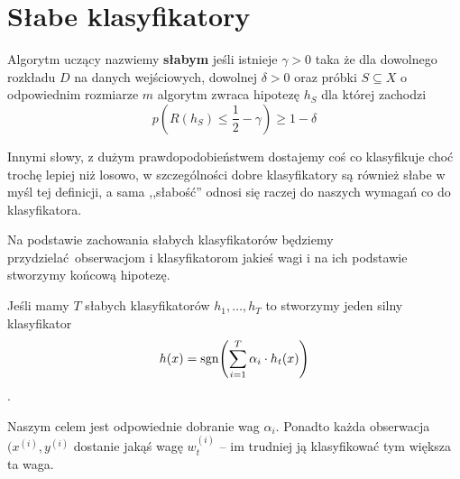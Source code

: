 \section{Słabe klasyfikatory}

\begin{definition}
Algorytm uczący nazwiemy \textbf{słabym} jeśli istnieje \( \gamma > 0 \) taka że dla dowolnego rozkładu \( D \) na danych wejściowych, dowolnej \( \delta > 0 \) oraz próbki \( S \subseteq X \) o odpowiednim rozmiarze \( m \) algorytm zwraca hipotezę \( h_S \) dla której zachodzi
\[
    p(R(h_S) \leq \frac{1}{2} - \gamma) \geq 1 - \delta
\]
\end{definition}

Innymi słowy, z dużym prawdopodobieństwem dostajemy coś co klasyfikuje choć trochę lepiej niż losowo, w szczególności dobre klasyfikatory są również słabe w myśl tej definicji, a sama ,,słabość'' odnosi się raczej do naszych wymagań co do klasyfikatora.

Na podstawie zachowania słabych klasyfikatorów będziemy przydzielać obserwacjom i klasyfikatorom jakieś wagi i na ich podstawie stworzymy końcową hipotezę.

Jeśli mamy \( T \) słabych klasyfikatorów \( h_1, \dots, h_T \) to stworzymy jeden silny klasyfikator
\[
    h(x) = \sgn\pars{\sum_{i = 1}^T \alpha_i \cdot h_t(x)}
\].

Naszym celem jest odpowiednie dobranie wag \( \alpha_i \).
Ponadto każda obserwacja \( (x^{(i)}, y^{(i)} \) dostanie jakąś wagę \( w^{(i)}_t \) -- im trudniej ją klasyfikować tym większa ta waga.

